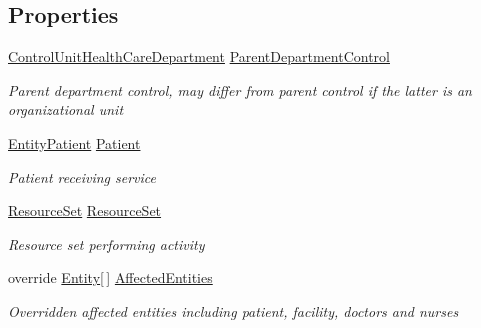 \subsection*{Properties}
\begin{DoxyCompactItemize}
\item 
\hyperlink{class_general_health_care_elements_1_1_control_units_1_1_control_unit_health_care_department}{Control\+Unit\+Health\+Care\+Department} \hyperlink{class_general_health_care_elements_1_1_activities_1_1_activity_health_care_action_a430aeec9f142063191f8cac075d18fbc}{Parent\+Department\+Control}
\begin{DoxyCompactList}\small\item\em Parent department control, may differ from parent control if the latter is an organizational unit \end{DoxyCompactList}\item 
\hyperlink{class_general_health_care_elements_1_1_entities_1_1_entity_patient}{Entity\+Patient} \hyperlink{class_general_health_care_elements_1_1_activities_1_1_activity_health_care_action_ac16540d0fe7df6198e2792b2367775e1}{Patient}
\begin{DoxyCompactList}\small\item\em Patient receiving service \end{DoxyCompactList}\item 
\hyperlink{class_general_health_care_elements_1_1_resource_handling_1_1_resource_set}{Resource\+Set} \hyperlink{class_general_health_care_elements_1_1_activities_1_1_activity_health_care_action_a46a1229f0760fce3bbb06b804fc2508a}{Resource\+Set}
\begin{DoxyCompactList}\small\item\em Resource set performing activity \end{DoxyCompactList}\item 
override \hyperlink{class_simulation_core_1_1_h_c_c_m_elements_1_1_entity}{Entity}\mbox{[}$\,$\mbox{]} \hyperlink{class_general_health_care_elements_1_1_activities_1_1_activity_health_care_action_ac98a7408a03eeff1548ee3a06e5223dd}{Affected\+Entities}
\begin{DoxyCompactList}\small\item\em Overridden affected entities including patient, facility, doctors and nurses \end{DoxyCompactList}\item 

\end{DoxyCompactItemize}
